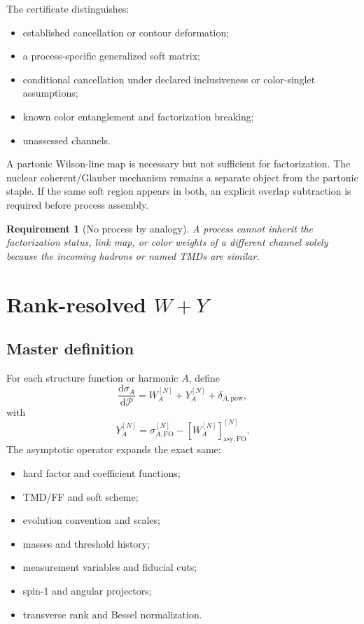 \documentclass[11pt]{article}
\newtheorem{requirement}[definition]{Requirement}
\newcommand{\dd}{\mathrm{d}}
\newcommand{\cP}{\mathcal P}
\newcommand{\FO}{\mathrm{FO}}
\newcommand{\asy}{\mathrm{asy}}
\newcommand{\powc}{\mathrm{pow}}
\begin{document}
The certificate distinguishes:
\begin{itemize}
\item established cancellation or contour deformation;
\item a process-specific generalized soft matrix;
\item conditional cancellation under declared inclusiveness or color-singlet assumptions;
\item known color entanglement and factorization breaking;
\item unassessed channels.
\end{itemize}

A partonic Wilson-line map is necessary but not sufficient for factorization.  The nuclear coherent/Glauber mechanism remains a separate object from the partonic staple.  If the same soft region appears in both, an explicit overlap subtraction is required before process assembly.

\begin{requirement}[No process by analogy]
A process cannot inherit the factorization status, link map, or color weights of a different channel solely because the incoming hadrons or named TMDs are similar.
\end{requirement}

\section{Rank-resolved \texorpdfstring{\(W+Y\)}{W+Y}}
\label{sec:wy}

\subsection{Master definition}

For each structure function or harmonic \(A\), define
\begin{equation}
 \frac{\dd\sigma_A}{\dd\cP}
 =W_A^{[N]}+Y_A^{[N]}+\delta_{A,\powc},
 \label{eq:wy-master}
\end{equation}
with
\begin{equation}
 Y_A^{[N]}=
 \sigma_{A,\FO}^{[N]}
 -\left[W_A^{[N]}\right]_{\asy,\FO}^{[N]}.
 \label{eq:y-def}
\end{equation}
The asymptotic operator expands the exact same:
\begin{itemize}
\item hard factor and coefficient functions;
\item TMD/FF and soft scheme;
\item evolution convention and scales;
\item masses and threshold history;
\item measurement variables and fiducial cuts;
\item spin-1 and angular projectors;
\item transverse rank and Bessel normalization.
\end{itemize}
\end{document}
